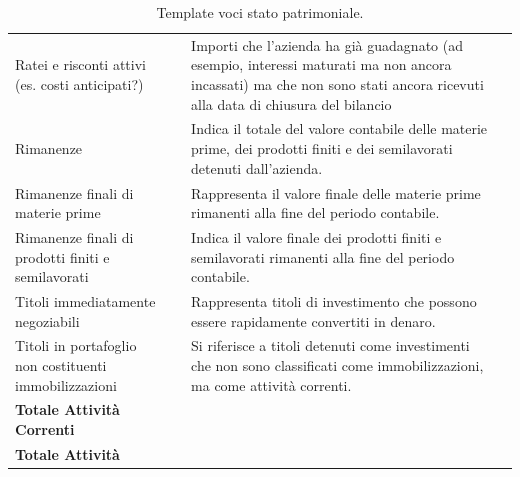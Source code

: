 \documentclass{article}
\newcommand{\RateiERiscontiAttivi}{Importi che l'azienda ha già guadagnato (ad esempio, interessi maturati ma non ancora incassati) ma che non sono stati ancora ricevuti alla data di chiusura del bilancio}
\newcommand{\Rimanenze}{Indica il totale del valore contabile delle materie prime, dei prodotti finiti e dei semilavorati detenuti dall'azienda.}
\newcommand{\RimanenzeFinaliMateriePrime}{Rappresenta il valore finale delle materie prime rimanenti alla fine del periodo contabile.}
\newcommand{\RimanenzeFinaliProdottiFinitiSemilavorati}{Indica il valore finale dei prodotti finiti e semilavorati rimanenti alla fine del periodo contabile.}
\newcommand{\TitoliImmediatamenteNegoziabili}{Rappresenta titoli di investimento che possono essere rapidamente convertiti in denaro.}
\newcommand{\TitoliInPortafoglioNonImmob}{Si riferisce a titoli detenuti come investimenti che non sono classificati come immobilizzazioni, ma come attività correnti.}
\begin{document}
\begin{table}[ht]
{\begin{tabular}{|l|c|l|c|}
            Ratei e risconti attivi (es. costi anticipati?)                                 &                    & \RateiERiscontiAttivi                             &                 \\
            Rimanenze                                                                       &                    & \Rimanenze                                        &                 \\
            Rimanenze finali di materie prime                                               &                    & \RimanenzeFinaliMateriePrime                      &                 \\
            Rimanenze finali di prodotti finiti e semilavorati                              &                    & \RimanenzeFinaliProdottiFinitiSemilavorati        &                 \\
            Titoli immediatamente negoziabili                                               &                    & \TitoliImmediatamenteNegoziabili                  &                 \\
            Titoli in portafoglio non costituenti immobilizzazioni                          &                    & \TitoliInPortafoglioNonImmob                      &                 \\
            \hline
            \textbf{Totale Attività Correnti}                                               &                    &                                                   &                 \\
            \hline
            \multicolumn{4}{|l|}{\textbf{Totale Attività}}                                                                                                                             \\
            \hline
        \end{tabular}
    }
    \caption{Template voci stato patrimoniale.}
\end{table}
\newpage
\end{document}
